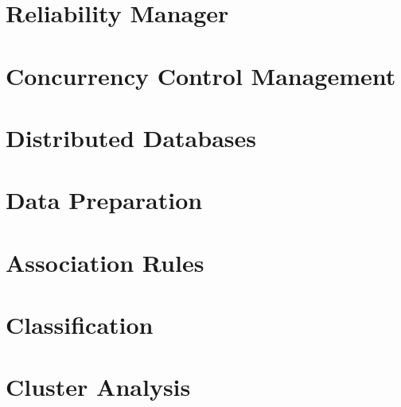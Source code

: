  

\pagestyle{empty} %

\titleGP %

\mainmatter

\chapter{Reliability Manager}


\chapter{Concurrency Control Management}


\chapter{Distributed Databases}


\chapter{Data Preparation}


\chapter{Association Rules}


\chapter{Classification}


\chapter{Cluster Analysis}



